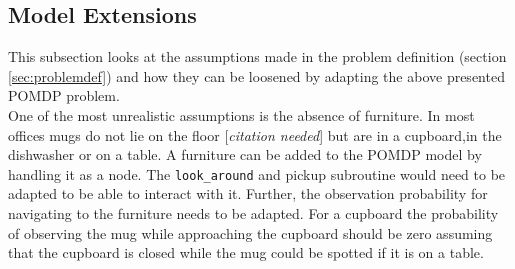 \subsection{Model Extensions}
This subsection looks at the assumptions made in the problem definition (section \ref{sec:problemdef}) and how they can be loosened by adapting the above presented POMDP problem. \\

One of the most unrealistic assumptions is the absence of furniture. In most offices mugs do not lie on the floor [\textit{citation needed}] but are in a cupboard,in the dishwasher or on a table. A furniture can be added to the POMDP model by handling it as a node. The \texttt{look\_around} and pickup subroutine would need to be adapted to be able to interact with it. Further, the observation probability for navigating to the furniture needs to be adapted. For a cupboard the probability of observing the mug while approaching the cupboard should be zero assuming that the cupboard is closed while the mug could be spotted if it is on a table.\\

